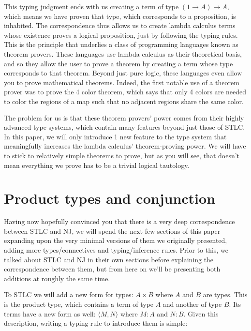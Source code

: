 \documentclass[12pt]{article}
\begin{document}
This typing judgment ends with us creating a term of type $(1 \to A) \to A$, which means we have proven that type, which corresponds to a proposition, is inhabited. The correspondence thus allows us to create lambda calculus terms whose existence proves a logical proposition, just by following the typing rules. This is the principle that underlies a class of programming languages known as theorem provers. These languages use lambda calculus as their theoretical basis, and so they allow the user to prove a theorem by creating a term whose type corresponds to that theorem. Beyond just pure logic, these languages even allow you to prove mathematical theorems. Indeed, the first notable use of a theorem prover was to prove the 4 color theorem, which says that only 4 colors are needed to color the regions of a map such that no adjacent regions share the same color.

The problem for us is that these theorem provers' power comes from their highly advanced type systems, which contain many features beyond just those of STLC. In this paper, we will only introduce 1 new feature to the type system that meaningfully increases the lambda calculus' theorem-proving power. We will have to stick to relatively simple theorems to prove, but as you will see, that doesn't mean everything we prove has to be a trivial logical tautology.

\section{Product types and conjunction}

Having now hopefully convinced you that there is a very deep correspondence between STLC and NJ, we will spend the next few sections of this paper expanding upon the very minimal versions of them we originally presented, adding more types/connectives and typing/inference rules. Prior to this, we talked about STLC and NJ in their own sections before explaining the correspondence between them, but from here on we'll be presenting both additions at roughly the same time.

To STLC we will add a new form for types: $A \times B$ where $A$ and $B$ are types. This is the product type, which contains a term of type $A$ and another of type $B$. Its terms have a new form as well: $\langle M, N \rangle$ where $M: A$ and $N: B$. Given this description, writing a typing rule to introduce them is simple:

\begin{prooftree}
\end{prooftree}
\end{document}
